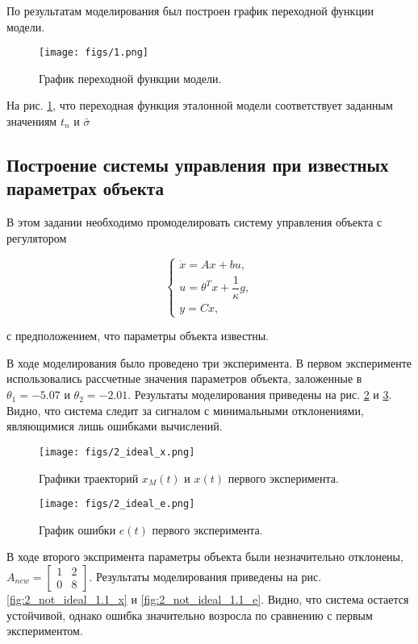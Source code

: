 \documentclass{article}
\begin{document}
По результатам моделирования был построен график переходной функции модели.

\begin{figure}[h!]
  \centering
  \texttt{[image: figs/1.png]}
  \caption{График переходной функции модели.} 
  \label{fig:1}
\end{figure}

На рис. \ref{fig:1}, что переходная функция эталонной модели соответствует заданным значениям $t_n$ и $\bar\sigma$

\FloatBarrier
\subsection{Построение системы управления при известных параметрах объекта}
В этом задании необходимо промоделировать систему управления объекта с регулятором

$$
\begin{cases}
    \dot x = Ax + bu, \\
    u = \theta^T x + \dfrac{1}{\kappa}g, \\
    y = Cx,
\end{cases}
$$

с предположением, что параметры объекта известны.

В ходе моделирования было проведено три эксперимента. В первом эксперименте использовались рассчетные значения параметров объекта, заложенные в $\theta_1 = -5.07$ и $\theta_2 = -2.01$. Результаты моделирования приведены на рис. \ref{fig:2_ideal_x} и \ref{fig:2_ideal_e}. Видно, что система следит за сигналом с минимальными отклонениями, являющимися лишь ошибками вычислений.

\begin{figure}[h!]
  \centering
  \texttt{[image: figs/2\_ideal\_x.png]}
  \caption{Графики траекторий $x_M(t)$ и $x(t)$ первого эксперимента.} 
  \label{fig:2_ideal_x}
\end{figure}

\begin{figure}[h!]
  \centering
  \texttt{[image: figs/2\_ideal\_e.png]}
  \caption{График ошибки $e(t)$ первого эксперимента.} 
  \label{fig:2_ideal_e}
\end{figure}
\FloatBarrier

В ходе второго экспримента параметры объекта были незначительно отклонены, $A_{new} =\begin{bmatrix} 1 & 2 \\ 0 & 8\end{bmatrix}$. Результаты моделирования приведены на рис. \ref{fig:2_not_ideal_1.1_x} и \ref{fig:2_not_ideal_1.1_e}. Видно, что система остается устойчивой, однако ошибка значительно возросла по сравнению с первым экспериментом.
\end{document}
